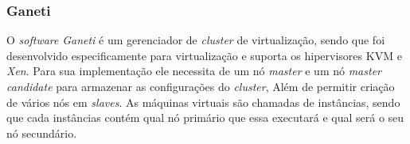 % 

\subsubsection{Ganeti}
\label{section:ganeti}
O \textit{software} \textit{Ganeti} \cite{ganeti} é um gerenciador de \textit{cluster} de virtualização, sendo que foi desenvolvido 
especificamente para virtualização e suporta os hipervisores \ac{KVM} e \textit{Xen}.
Para sua implementação ele necessita de um nó \textit{master} e um nó \textit{master candidate} para armazenar as configurações do \textit{cluster},
Além de permitir criação de vários nós em \textit{slaves}. As máquinas virtuais são chamadas de instâncias, sendo que cada instâncias contém qual
nó primário que essa executará e qual será o seu nó secundário.

